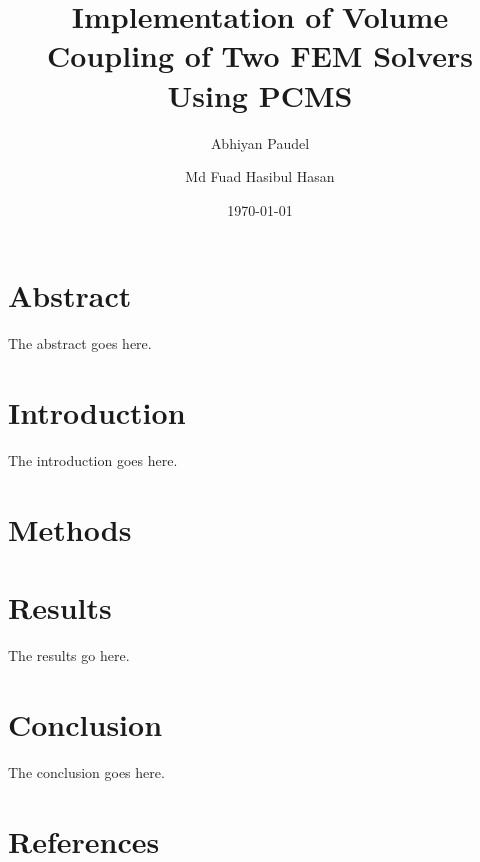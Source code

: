 \documentclass[12pt]{article}
\begin{document}
\title{Implementation of Volume Coupling of Two FEM Solvers  Using PCMS}
\author[1]{Abhiyan Paudel}
\author[1]{Md Fuad Hasibul Hasan}

\date{\today}
\maketitle

\section*{Abstract}
\label{sec:abstract}
The abstract goes here.

\section{Introduction}
\label{sec:intro}
The introduction goes here.\cite{mfem}

\section{Methods}
\label{sec:methods}

\section{Results}
\label{sec:results}
The            results             go             here.


\section{Conclusion}
\label{sec:conclusion}
The conclusion goes here.

\section{References}
\label{sec:references}
\printbibliography[heading=none]
\end{document}
